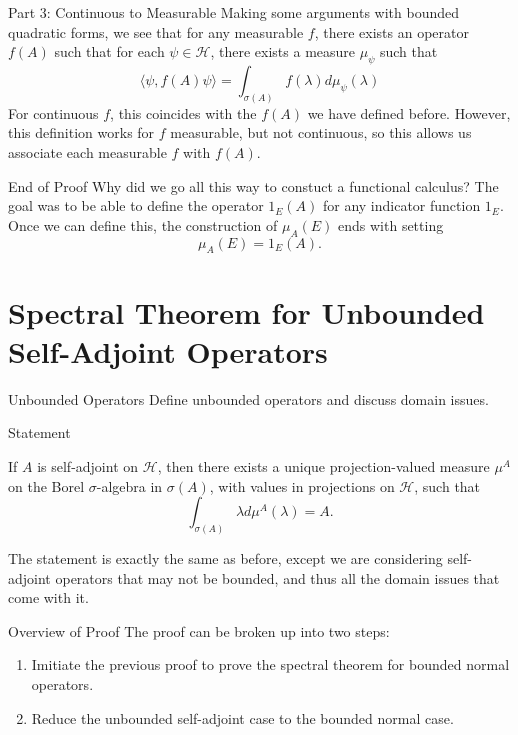 \documentclass{beamer}
\theoremstyle{plain}
\theoremstyle{definition}
\renewcommand{\l}{\lambda}
\newcommand{\s}{\sigma}
\newcommand{\cH}{{\mathcal H}}
\begin{document}
\begin{frame}{Part 3: Continuous to Measurable}
    Making some arguments with bounded quadratic forms, we see that for any measurable $f$, there exists an operator $f(A)$ such that for each $\psi \in \cH$, there exists a measure $\mu_\psi$ such that
    \[
        \langle \psi, f(A)\psi \rangle = \int_{\s(A)} f(\l)d\mu_\psi(\l)
    \]
    For continuous $f$, this coincides with the $f(A)$ we have defined before. However, this definition works for $f$ measurable, but not continuous, so this allows us associate each measurable $f$ with $f(A)$.
\end{frame}

\begin{frame}{End of Proof}
    Why did we go all this way to constuct a functional calculus? The goal was to be able to define the operator $1_E(A)$ for any indicator function $1_E$. Once we can define this, the construction of $\mu_A(E)$ ends with setting
    \[
        \mu_A(E) = 1_E(A).
    \]
\end{frame}

\section{Spectral Theorem for Unbounded Self-Adjoint Operators}

\begin{frame}{Unbounded Operators}
    Define unbounded operators and discuss domain issues.
\end{frame}

\begin{frame}{Statement}
    \begin{theorem}
        If $A$ is self-adjoint on $\cH$, then there exists a unique projection-valued measure $\mu^A$ on the Borel $\s$-algebra in $\s(A)$, with values in projections on $\cH$, such that
        \[
            \int_{\s(A)} \l d\mu^A(\l) = A.
        \]
    \end{theorem}
    \medskip
    The statement is exactly the same as before, except we are considering self-adjoint operators that may not be bounded, and thus all the domain issues that come with it.
\end{frame}

\begin{frame}{Overview of Proof}
    The proof can be broken up into two steps:
    \begin{enumerate}
        \item Imitiate the previous proof to prove the spectral theorem for bounded normal operators.
        \item Reduce the unbounded self-adjoint case to the bounded normal case.
    \end{enumerate}
\end{frame}
\end{document}
